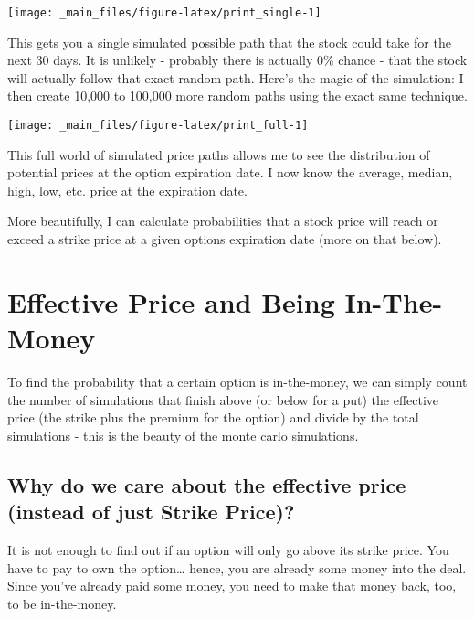 \documentclass[
]{book}
\begin{document}
\begin{center}\texttt{[image: \_main\_files/figure-latex/print\_single-1]} \end{center}

This gets you a single simulated possible path that the stock could take for the
next 30 days. It is unlikely - probably there is actually 0\% chance - that the
stock will actually follow that exact random path. Here's the magic of the
simulation: I then create 10,000 to 100,000 more random paths using the exact
same technique.

\begin{center}\texttt{[image: \_main\_files/figure-latex/print\_full-1]} \end{center}

This full world of simulated price paths allows me to see the distribution of
potential prices at the option expiration date. I now know the average, median,
high, low, etc. price at the expiration date.

More beautifully, I can calculate probabilities that a stock price will reach
or exceed a strike price at a given options expiration date (more on that below).

\hypertarget{effective-price-and-being-in-the-money}{%
\section{Effective Price and Being In-The-Money}\label{effective-price-and-being-in-the-money}}

To find the probability that a certain option is in-the-money, we can simply
count the number of simulations that finish above (or below for a put) the
effective price (the strike plus the premium for the option) and divide by the
total simulations - this is the beauty of the monte carlo simulations.

\hypertarget{why-do-we-care-about-the-effective-price-instead-of-just-strike-price}{%
\subsection{Why do we care about the effective price (instead of just Strike Price)?}\label{why-do-we-care-about-the-effective-price-instead-of-just-strike-price}}

It is not enough to find out if an option will only go above its strike price.
You have to pay to own the option\ldots{} hence, you are already some money into the
deal. Since you've already paid some money, you need to make that money back,
too, to be in-the-money.
\end{document}
